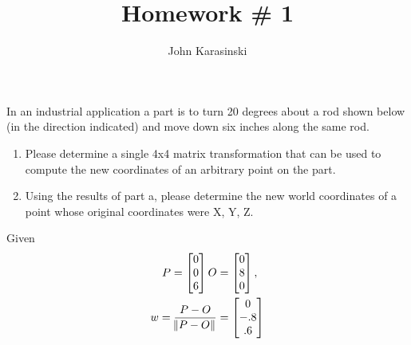 \documentclass[onecolumn,10pt]{jhwhw}
\author{John Karasinski}
\title{Homework \# 1}
\begin{document}

\problem{}
In an industrial application a part is to turn 20 degrees about a rod shown below (in the direction indicated) and move down six inches along the same rod.
\begin{enumerate}
    \item Please determine a single 4x4 matrix transformation that can be used to compute the new coordinates of an arbitrary point on the part.
    \item Using the results of part a, please determine the new world coordinates of a point whose original coordinates were X, Y, Z.
\end{enumerate}

Given
\begin{align*}
P =
\begin{bmatrix*}[c]
0 \\
0 \\
6
\end{bmatrix*}
O &=
\begin{bmatrix*}[c]
0 \\
8 \\
0
\end{bmatrix*},\\
w = \dfrac{P - O}{\norm{P - O}} &=
\begin{bmatrix*}[c]
0 \\
-.8 \\
.6
\end{bmatrix*}
\end{align*}
\end{document}
